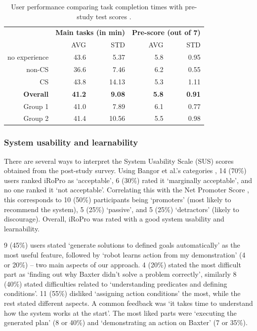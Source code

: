 \begin{table}
	\centering
	\caption{User performance comparing task completion times with pre-study test scores \cite{liang2019d}.}
	\label{table:performance}
	\begin{center}
		\begin{tabular}{r|rr|rr}
			& \multicolumn{2}{c}{\textbf{Main tasks (in min)}} & \multicolumn{2}{c}{\textbf{Pre-score (out of 7)}} \\
			& AVG                & STD                & AVG                   & STD                   \\ \hline
			no experience  & 43.6               & 5.37               & 5.8                   & 0.95                  \\
			non-CS  & 36.6               & 7.46               & 6.2                   & 0.55                  \\
			CS      & 43.8               & 14.13              & 5.3                   & 1.11                 \\ \hline
			\textbf{Overall} & \textbf{41.2}              & \textbf{9.08}               & \textbf{5.8}                   & \textbf{0.91}                  \\ \hline
			Group 1 & 41.0               & 7.89               & 6.1                   & 0.77                  \\
			Group 2 & 41.4               & 10.56              & 5.5                   & 0.98                 
		\end{tabular}
	\end{center}
\end{table}

\subsubsection*{\textbf{System usability and learnability}} 
There are several ways to interpret the System Usability Scale (SUS) scores \cite{brooke2013sus} obtained from the post-study survey. 
Using Bangor et al.'s categories \cite{bangor2008suseval}, 14 (70\%) users ranked iRoPro as `acceptable', 6 (30\%) rated it `marginally acceptable', and no one ranked it `not acceptable'.
Correlating this with the Net Promoter Score \cite{nps}, this corresponds to 10 (50\%) participants being `promoters' (most likely to recommend the system), 5 (25\%) `passive', and 5 (25\%) `detractors' (likely to discourage).
Overall, iRoPro was rated with a good system usability and learnability.

9 (45\%) users stated `generate solutions to defined goals automatically' as the most useful feature, followed by `robot learns action from my demonstration' (4 or 20\%) -- two main aspects of our approach.
4 (20\%) stated the most difficult part as `finding out why Baxter didn't solve a problem correctly', similarly 8 (40\%) stated difficulties related to `understanding predicates and defining conditions'. 
11 (55\%) disliked `assigning action conditions' the most, while the rest stated different aspects.
A common feedback was `it takes time to understand how the system works at the start'.
The most liked parts were `executing the generated plan' (8 or 40\%) and `demonstrating an action on Baxter' (7 or 35\%).

